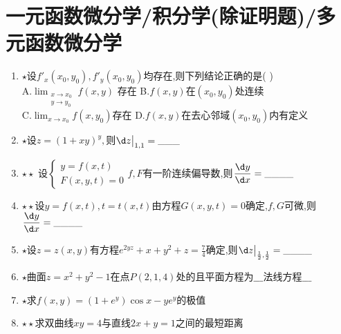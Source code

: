 \documentclass[12pt, a4paper, oneside, UTF8]{ctexbook}
\begin{document}
\section{一元函数微分学/积分学(除证明题)/多元函数微分学}
\begin{enumerate}
    \item $\star$设$f'_x(x_0,y_0),f'_y(x_0,y_0)$均存在,则下列结论正确的是(  ) \\
    A.$ \displaystyle \lim_{\substack{x\to x_0\\ y\to y_0}}f(x,y)$ 存在 \qquad
    B.$f(x,y)$在$(x_0,y_0)$处连续 \\
    C.$\lim_{x\to x_0}f(x,y_0)$存在 \qquad
    D.$f(x,y)$在去心邻域$(x_0,y_0)$内有定义 

    \item $\star$设$z=(1+xy)^y,$则$\d z\big|_{1,1}=\_\_\_$ 
    
    \item $\star\star$ 设$\begin{cases}
        y = f(x, t) \\
        F(x,y,t) = 0
    \end{cases}f,F$有一阶连续偏导数,则$\displaystyle\frac{\d y}{\d x}=\_\_\_\_$ 

    \item $\star\star$设$y=f(x,t),t=t(x,t)$由方程$G(x,y,t)=0$确定,$f,G$可微,则$\displaystyle\frac{\d y}{\d x}=\_\_\_\_$

    \item $\star$设$z=z(x,y)$有方程$e^{2yz}+x+y^2+z=\frac{7}{4}$确定,则$\d z\big|_{\frac{1}{2},\frac{1}{2}}=\_\_\_\_$

    \item $\star$曲面$z=x^2+y^2-1$在点$P(2,1,4)$处的且平面方程为$\_\_\_$法线方程$\_\_\_$ 

    \item $\star$求$f(x,y)=(1+e^y)\cos{x}-ye^y$的极值 
    
    \item $\star\star$求双曲线$xy=4$与直线$2x+y=1$之间的最短距离
\end{enumerate}
\end{document}
